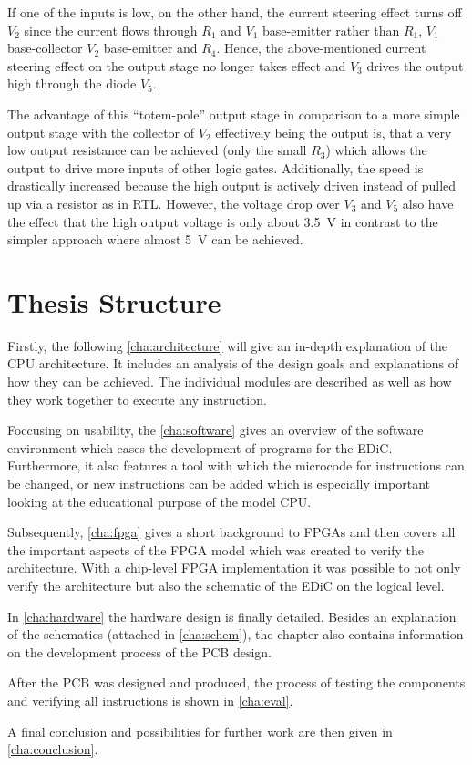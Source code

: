 If one of the inputs is low, on the other hand, the current steering effect turns off $V_2$ since the current flows through $R_1$ and $V_1$ base-emitter rather than $R_1$, $V_1$ base-collector $V_2$ base-emitter and $R_4$.
Hence, the above-mentioned current steering effect on the output stage no longer takes effect and $V_3$ drives the output high through the diode $V_5$.

The advantage of this ``totem-pole'' output stage in comparison to a more simple output stage with the collector of $V_2$ effectively being the output is, that a very low output resistance can be achieved (only the small $R_3$) which allows the output to drive more inputs of other logic gates.
Additionally, the speed is drastically increased because the high output is actively driven instead of pulled up via a resistor as in \gls{RTL}.
However, the voltage drop over $V_3$ and $V_5$ also have the effect that the high output voltage is only about \qty{3.5}{\volt} in contrast to the simpler approach where almost \qty{5}{\volt} can be achieved.


\section{Thesis Structure}
Firstly, the following \cref{cha:architecture} will give an in-depth explanation of the \gls{CPU} architecture.
It includes an analysis of the design goals and explanations of how they can be achieved.
The individual modules are described as well as how they work together to execute any instruction.

Foccusing on usability, the \cref{cha:software} gives an overview of the software environment which eases the development of programs for the \gls{EDiC}.
Furthermore, it also features a tool with which the microcode for instructions can be changed, or new instructions can be added which is especially important looking at the educational purpose of the model \gls{CPU}.

Subsequently, \cref{cha:fpga} gives a short background to \glspl{FPGA} and then covers all the important aspects of the \gls{FPGA} model which was created to verify the architecture.
With a chip-level \gls{FPGA} implementation it was possible to not only verify the architecture but also the schematic of the \gls{EDiC} on the logical level.

In \cref{cha:hardware} the hardware design is finally detailed.
Besides an explanation of the schematics (attached in \cref{cha:schem}), the chapter also contains  information on the development process of the \gls{PCB} design.

After the \gls{PCB} was designed and produced, the process of testing the components and verifying all instructions is shown in \cref{cha:eval}.

A final conclusion and possibilities for further work are then given in \cref{cha:conclusion}.
